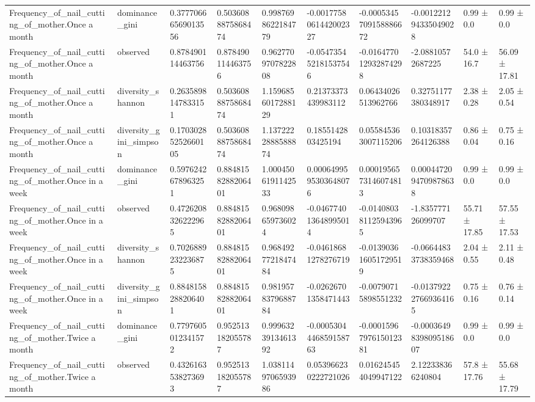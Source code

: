 \begin{longtable}{llllllllll}
Frequency\_of\_nail\_cutting\_of\_mother.Once a month & dominance\_gini & 0.37770666569013556 & 0.5036088875868474 & 0.9987698622184779 & -0.0017758061442002327 & -0.0005345709158886672 & -0.001221294335049028 & 0.99 ± 0.0 & 0.99 ± 0.0 \\
Frequency\_of\_nail\_cutting\_of\_mother.Once a month & observed & 0.878490114463756 & 0.878490114463756 & 0.9627709707822808 & -0.054735452181537546 & -0.016477012932874298 & -2.08810572687225 & 54.0 ± 16.7 & 56.09 ± 17.81 \\
Frequency\_of\_nail\_cutting\_of\_mother.Once a month & diversity\_shannon & 0.2635898147833151 & 0.5036088875868474 & 1.1596856017288129 & 0.21373373439983112 & 0.06434026513962766 & 0.32751177380348917 & 2.38 ± 0.28 & 2.05 ± 0.54 \\
Frequency\_of\_nail\_cutting\_of\_mother.Once a month & diversity\_gini\_simpson & 0.17030285252660105 & 0.5036088875868474 & 1.1372222888588874 & 0.1855142803425194 & 0.055845363007115206 & 0.10318357264126388 & 0.86 ± 0.04 & 0.75 ± 0.16 \\
Frequency\_of\_nail\_cutting\_of\_mother.Once in a week & dominance\_gini & 0.5976242678963251 & 0.8848158288206401 & 1.0004506191142533 & 0.0006499595303648076 & 0.0001956573146074813 & 0.0004472094709878638 & 0.99 ± 0.0 & 0.99 ± 0.0 \\
Frequency\_of\_nail\_cutting\_of\_mother.Once in a week & observed & 0.4726208326222965 & 0.8848158288206401 & 0.968098659736024 & -0.046774013648995014 & -0.014080381125943965 & -1.835777126099707 & 55.71 ± 17.85 & 57.55 ± 17.53 \\
Frequency\_of\_nail\_cutting\_of\_mother.Once in a week & diversity\_shannon & 0.7026889232236875 & 0.8848158288206401 & 0.9684927721847484 & -0.04618681278276719 & -0.013903616051729519 & -0.06644833738359468 & 2.04 ± 0.55 & 2.11 ± 0.48 \\
Frequency\_of\_nail\_cutting\_of\_mother.Once in a week & diversity\_gini\_simpson & 0.8848158288206401 & 0.8848158288206401 & 0.9819578379688784 & -0.02626701358471443 & -0.00790715898551232 & -0.013792227669364165 & 0.75 ± 0.16 & 0.76 ± 0.14 \\
Frequency\_of\_nail\_cutting\_of\_mother.Twice a month & dominance\_gini & 0.7797605012341572 & 0.952513182055787 & 0.9996323913461392 & -0.0005304446859158763 & -0.0001596797615012381 & -0.0003649839809518607 & 0.99 ± 0.0 & 0.99 ± 0.0 \\
Frequency\_of\_nail\_cutting\_of\_mother.Twice a month & observed & 0.4326163538273693 & 0.952513182055787 & 1.0381149706593986 & 0.053966230222721026 & 0.016245454049947122 & 2.122338366240804 & 57.8 ± 17.76 & 55.68 ± 17.79 \\

\end{longtable}
